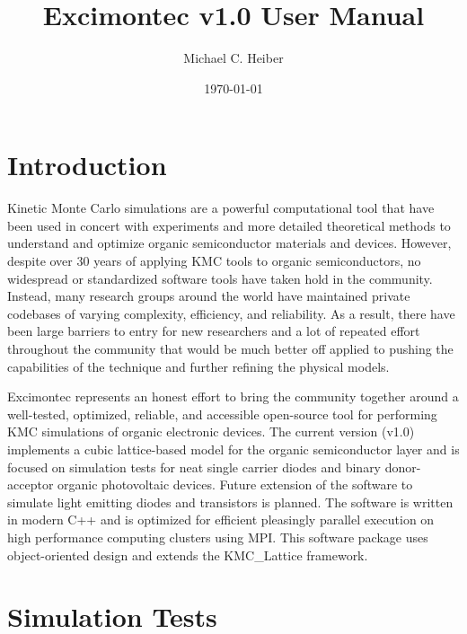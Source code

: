 \documentclass[%
 reprint,onecolumn,notitlepage,
superscriptaddress,longbibliography,
 amsmath,amssymb,
 aps,rmp,floatfix,
]{revtex4-1}
\begin{document}
\title{Excimontec v1.0 User Manual}
\author{Michael C. Heiber}

\date{\today}

\maketitle

\tableofcontents

\section{Introduction}

Kinetic Monte Carlo simulations are a powerful computational tool that have been used in concert with experiments and more detailed theoretical methods to understand and optimize organic semiconductor materials and devices.\cite{heiber2019chapter} 
However, despite over 30 years of applying KMC tools to organic semiconductors, no widespread or standardized software tools have taken hold in the community. 
Instead, many research groups around the world have maintained private codebases of varying complexity, efficiency, and reliability. 
As a result, there have been large barriers to entry for new researchers and a lot of repeated effort throughout the community that would be much better off applied to pushing the capabilities of the technique and further refining the physical models.

Excimontec represents an honest effort to bring the community together around a well-tested, optimized, reliable, and accessible open-source tool for performing KMC simulations of organic electronic devices. 
The current version (v1.0) implements a cubic lattice-based model for the organic semiconductor layer and is focused on simulation tests for neat single carrier diodes and binary donor-acceptor organic photovoltaic devices.
Future extension of the software to simulate light emitting diodes and transistors is planned.
The software is written in modern C++ and is optimized for efficient pleasingly parallel execution on high performance computing clusters using MPI. 
This software package uses object-oriented design and extends the KMC\_Lattice framework.\cite{heiber2019joss1} 

\section{Simulation Tests}
\end{document}
